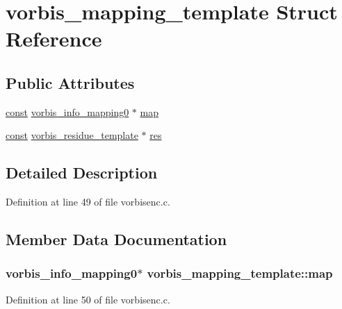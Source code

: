 \hypertarget{structvorbis__mapping__template}{}\section{vorbis\+\_\+mapping\+\_\+template Struct Reference}
\label{structvorbis__mapping__template}
\subsection*{Public Attributes}
\begin{DoxyCompactItemize}
\item 
\hyperlink{getopt1_8c_a2c212835823e3c54a8ab6d95c652660e}{const} \hyperlink{structvorbis__info__mapping0}{vorbis\+\_\+info\+\_\+mapping0} $\ast$ \hyperlink{structvorbis__mapping__template_aa3f97dc5e56ab02a477dadbdddc2dd74}{map}
\item 
\hyperlink{getopt1_8c_a2c212835823e3c54a8ab6d95c652660e}{const} \hyperlink{structvorbis__residue__template}{vorbis\+\_\+residue\+\_\+template} $\ast$ \hyperlink{structvorbis__mapping__template_a93ca70f5c4a50d4d75c83cfb62a55327}{res}
\end{DoxyCompactItemize}


\subsection{Detailed Description}


Definition at line 49 of file vorbisenc.\+c.



\subsection{Member Data Documentation}
\subsubsection[{\texorpdfstring{map}{map}}]{ {\bf vorbis\+\_\+info\+\_\+mapping0}$\ast$ vorbis\+\_\+mapping\+\_\+template\+::map}\hypertarget{structvorbis__mapping__template_aa3f97dc5e56ab02a477dadbdddc2dd74}{}\label{structvorbis__mapping__template_aa3f97dc5e56ab02a477dadbdddc2dd74}


Definition at line 50 of file vorbisenc.\+c.

